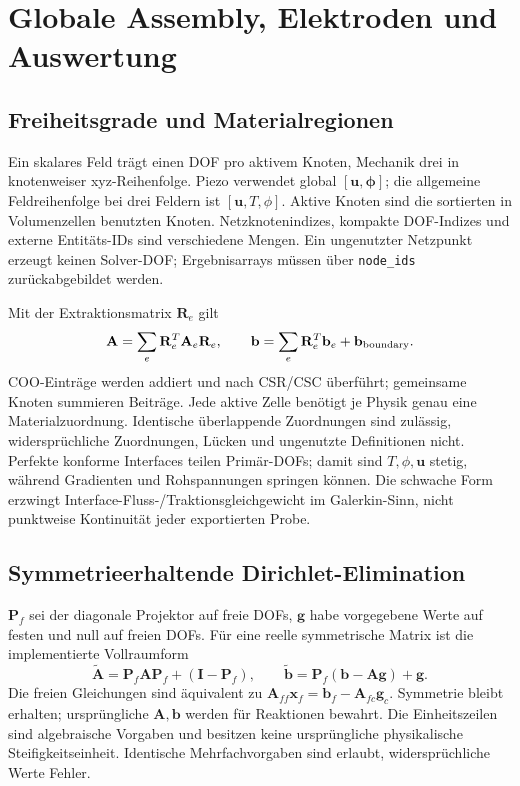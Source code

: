\chapter{Globale Assembly, Elektroden und Auswertung}\label{chap:algebra}
\section{Freiheitsgrade und Materialregionen}
Ein skalares Feld trägt einen DOF pro aktivem Knoten, Mechanik drei in
knotenweiser xyz-Reihenfolge. Piezo verwendet global $[\mathbf u,\boldsymbol\phi]$;
die allgemeine Feldreihenfolge bei drei Feldern ist $[\mathbf u,T,\phi]$.
Aktive Knoten sind die sortierten in Volumenzellen benutzten Knoten.
Netzknotenindizes, kompakte DOF-Indizes und externe Entitäts-IDs sind
verschiedene Mengen. Ein ungenutzter Netzpunkt erzeugt keinen Solver-DOF;
Ergebnisarrays müssen über \texttt{node\_ids} zurückabgebildet werden.

Mit der Extraktionsmatrix $\mathbf R_e$ gilt
\begin{equation}\label{eq:assembly}
\mathbf A=\sum_e\mathbf R_e^T\mathbf A_e\mathbf R_e,
\qquad\mathbf b=\sum_e\mathbf R_e^T\mathbf b_e+\mathbf b_{\rm boundary}.
\end{equation}
COO-Einträge werden addiert und nach CSR/CSC überführt; gemeinsame Knoten
summieren Beiträge. Jede aktive Zelle benötigt je Physik genau eine
Materialzuordnung. Identische überlappende Zuordnungen sind zulässig,
widersprüchliche Zuordnungen, Lücken und ungenutzte Definitionen nicht.
Perfekte konforme Interfaces teilen Primär-DOFs; damit sind $T,\phi,\mathbf u$
stetig, während Gradienten und Rohspannungen springen können.
Die schwache Form erzwingt Interface-Fluss-/Traktionsgleichgewicht im
Galerkin-Sinn, nicht punktweise Kontinuität jeder exportierten Probe.

\section{Symmetrieerhaltende Dirichlet-Elimination}
$\mathbf P_f$ sei der diagonale Projektor auf freie DOFs, $\mathbf g$ habe
vorgegebene Werte auf festen und null auf freien DOFs. Für eine reelle
symmetrische Matrix ist die implementierte Vollraumform
\begin{equation}\label{eq:dirichlet}
\widetilde{\mathbf A}=\mathbf P_f\mathbf A\mathbf P_f+(\mathbf I-\mathbf P_f),
\qquad\widetilde{\mathbf b}=\mathbf P_f(\mathbf b-\mathbf A\mathbf g)+\mathbf g.
\end{equation}
Die freien Gleichungen sind äquivalent zu
$\mathbf A_{ff}\mathbf x_f=\mathbf b_f-\mathbf A_{fc}\mathbf g_c$.
Symmetrie bleibt erhalten; ursprüngliche $\mathbf A,\mathbf b$ werden für
Reaktionen bewahrt. Die Einheitszeilen sind algebraische Vorgaben und besitzen
keine ursprüngliche physikalische Steifigkeitseinheit.
Identische Mehrfachvorgaben sind erlaubt, widersprüchliche Werte Fehler.

